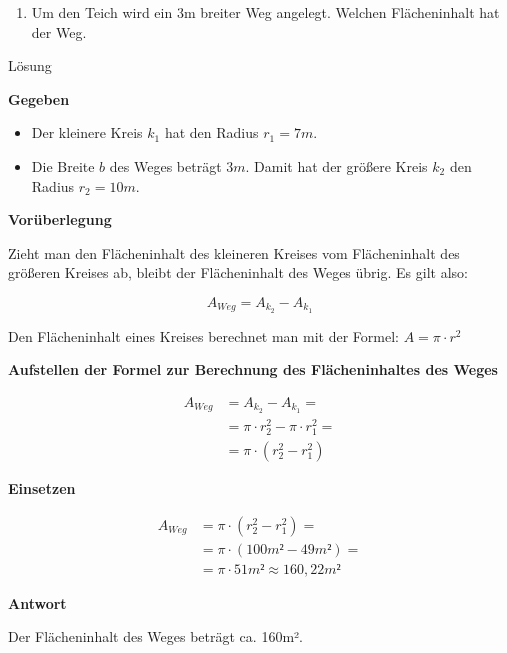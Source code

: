 \documentclass[
  ngerman,
]{book}
\providecommand{\tightlist}{%
  \setlength{\itemsep}{0pt}\setlength{\parskip}{0pt}}
\begin{document}
\begin{enumerate}
\def\labelenumi{\alph{enumi})}
\tightlist
\item
  Um den Teich wird ein 3m breiter Weg angelegt. Welchen Flächeninhalt hat der Weg.
\end{enumerate}

Lösung

\textbf{Gegeben}

\begin{itemize}
\tightlist
\item
  Der kleinere Kreis \(k_1\) hat den Radius \(r_1 = 7m\).
\item
  Die Breite \(b\) des Weges beträgt \(3m\). Damit hat der größere Kreis \(k_2\) den Radius \(r_2= 10m\).
\end{itemize}

\textbf{Vorüberlegung}

Zieht man den Flächeninhalt des kleineren Kreises vom Flächeninhalt des größeren Kreises ab, bleibt der Flächeninhalt des Weges übrig. Es gilt also:

\[A_{Weg}=A_{k_2} - A_{k_1}\]

Den Flächeninhalt eines Kreises berechnet man mit der Formel: \(A=\pi \cdot r^2\)

\textbf{Aufstellen der Formel zur Berechnung des Flächeninhaltes des Weges}

\[\begin{align} A_{Weg} &=A_{k_2} - A_{k_1} =\\
                        &= \pi \cdot r^2_2 - \pi \cdot r^2_1 =\\
                        &= \pi \cdot (r^2_2 -r^2_1) \end{align}\]

\textbf{Einsetzen}

\[\begin{align} A_{Weg} &= \pi \cdot (r^2_2 -r^2_1) =\\
                        &=\pi \cdot (100m² - 49m²) =\\
                        &= \pi \cdot 51m² \approx 160,22m² \end{align}\]

\textbf{Antwort}

Der Flächeninhalt des Weges beträgt ca. 160m².

\hypertarget{section-40}{%
\subsubsection*{}\label{section-40}}
\end{document}
